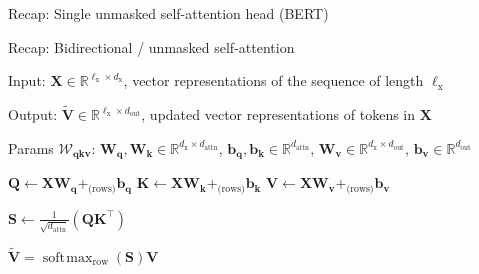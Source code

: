\documentclass[12pt,aspectratio=169,handout]{beamer}
\DeclareMathOperator*{\softmax}{soft\!\max}
\begin{document}
\begin{frame}{Recap: Single unmasked self-attention head (BERT)}
	
\end{frame}


\begin{frame}{Recap: Bidirectional / unmasked self-attention}
	
	\begin{minipage}[t][10cm][t]{15cm}
		
		Input: $\bm{X} \in \mathbb{R}^{\ell_{\text{x}} \times d_{\text{x}}}$, vector representations of the sequence of length $\ell_{\text{x}}$
		
		Output: $\bm{\tilde{V}} \in \mathbb{R}^{\ell_{\text{x}} \times d_{\text{out}}}$, updated vector representations of tokens in $\bm{X}$
		
		Params $\bm{\mathcal{W}_{qkv}}$: $\bm{W_q}, \bm{W_k} \in \mathbb{R}^{d_\text{x} \times d_\text{attn}}$, $\bm{b_q}, \bm{b_k} \in \mathbb{R}^{d_\text{attn}}$, $\bm{W_v} \in \mathbb{R}^{d_\text{x} \times d_\text{out}}$, $ \bm{b_v} \in \mathbb{R}^{d_\text{out}}$
		
		\begin{algorithmic}[1]
			\State $\bm{Q} \gets \bm{X} \bm{W_q} +_{\text{(rows)}} \bm{b_q}$
			\State $\bm{K} \gets \bm{X} \bm{W_k} +_{\text{(rows)}} \bm{b_k}$
			\State $\bm{V} \gets \bm{X} \bm{W_v} +_{\text{(rows)}} \bm{b_v}$
			
			\State $\bm{S} \gets \frac{1}{\sqrt{d_{\text{attn}}}} (\bm{Q} \bm{K}^\top)$
			
			\State \Return $\bm{\tilde V} = \softmax_{\text{row}}(\bm{S}) \bm{V}$
			
			\EndFunction
		\end{algorithmic}
		
	\end{minipage}
\end{frame}
\end{document}
